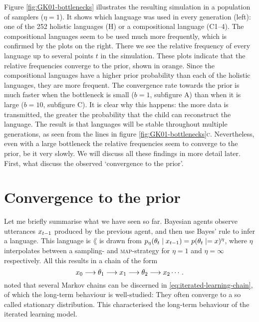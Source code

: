 \documentclass{../src/bcthesispart}
\begin{document}
Figure \ref{fig:GK01-bottlenecks} illustrates the resulting simulation in a population of samplers ($\eta=1$).
It shows which language was used in every generation (left): one of the 252 holistic languages (H) or a compositional language (C1--4).
The compositional languages seem to be used much more frequently, which is confirmed by the plots on the right.
There we see the relative frequency of every language up to several points $t$ in the simulation.
These plots indicate that the relative frequencies converge to the prior, shown in orange.
Since the compositional languages have a higher prior probability than each of the holistic languages, they are more frequent.
The convergence rate towards the prior is much faster when the bottleneck is small ($b=1$, subfigure A) than when it is large ($b=10$, subfigure C).
It is clear why this happens: the more data is transmitted, the greater the probability that the child can reconstruct the language.
The result is that languages will be stable throughout multiple generations, as seen from the lines in figure \ref{fig:GK01-bottlenecks}\textsc{c}.
Nevertheless, even with a large bottleneck the relative frequencies seem to converge to the prior, be it very slowly.
We will discuss all these findings in more detail later. 
First, what discuss the observed ‘convergence to the prior’.




\section{Convergence to the prior}



Let me briefly summarise what we have seen so far.
Bayesian agents observe utterances $x_{t-1}$ produced by the previous agent, and then use Bayes’ rule to infer a language.
This language is $\lang$ is drawn from $p_\eta(\theta_t \mid x_{t-1}) = p(\theta_t \mid =x)^\eta$, where $\eta$ interpolates between a sampling- and \textsc{map}-strategy for $\eta=1$ and $\eta = \infty$ respectively.
All this results in a chain  of the form
\begin{equation}
	\label{eq:iterated-learning-chain}
	x_0 
		\longrightarrow \theta_1 
		\longrightarrow x_1 
		\longrightarrow \theta_2 
		\longrightarrow x_2 
		\cdots.
\end{equation}
\textcite{Griffiths2005} noted that several Markov chains can be discerned in \eqref{eq:iterated-learning-chain}, of which the long-term behaviour is well-studied: 
They often converge to a so called stationary distribution.
This characterised the long-term behaviour of the iterated learning model.
\end{document}
